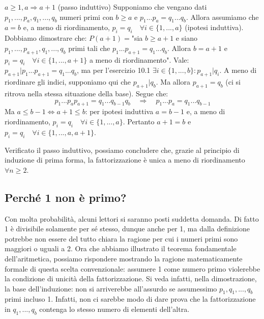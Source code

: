 \begin{tcolorbox}[enhanced, breakable, title={Teorema Fondamentale dell'Aritmetica}]
$a \geq 1, a \Rightarrow a+1$ (passo induttivo) Supponiamo che vengano dati $p_1,...,p_a,
q_1,...,q_b$ numeri primi con $b \geq a$ e $p_1...p_a = q_1...q_b$. Allora
assumiamo che $a=b$ e, a meno di riordinamento, $p_i = q_i \quad \forall i \in \{1,...,a\}$
(ipotesi induttiva). Dobbiamo dimostrare che: $P(a+1)= $"sia $b \geq a+1$ e siano
$p_1,...,p_{a+1},q_1,...,q_b$ primi tali che $p_1...p_{a+1} = q_1...q_b$.
Allora $b = a+1$ e $p_i = q_i \quad \forall i \in \{1,...,a+1\}$
a meno di riordinamento". Vale: $p_{a+1}|p_1...p_{a+1} = q_1...q_b$, ma per
l'esercizio 10.1 $\exists i \in \{1,...,b\}: p_{a+1}|q_i$. A meno di riordinare
gli indici, supponiamo qui che $p_{a+1}|q_b$. Ma allora $p_{a+1} = q_b$ (ci si
ritrova nella stessa situazione della base). Segue che:
\[ p_1...p_ap_{a+1} = q_1...q_{b-1}q_b \quad \Rightarrow \quad  p_1...p_a = q_1...q_{b-1} \]
Ma $a \leq b-1 \Leftrightarrow a+1 \leq b$: per ipotesi induttiva $a = b-1$ e,
a meno di riordinamento, $p_i = q_i \quad \forall i \in \{1,...,a\}$. Pertanto
$a+1 = b$ e $p_i = q_i \quad \forall i \in \{1,...,a,a+1\}$.

Verificato il passo induttivo, possiamo concludere che, grazie al principio di
induzione di prima forma, la fattorizzazione è unica a meno di riordinamento
$\forall n \geq 2$.
\cvd
\end{tcolorbox}

\subsection*{Perché 1 non è primo?}
Con molta probabilità, alcuni lettori si saranno posti suddetta domanda. Di fatto
1 è divisibile solamente per sé stesso, dunque anche per 1, ma dalla definizione
potrebbe non essere del tutto chiara la ragione per cui i numeri primi
sono maggiori o uguali a 2. Ora che abbiamo illustrato il teorema fondamentale
dell'aritmetica, possiamo rispondere mostrando la ragione matematicamente
formale di questa scelta convenzionale: assumere 1 come numero primo violerebbe
la condizione di unicità della fattorizzazione. Si veda infatti, nella dimostrazione,
la base dell'induzione: non si arriverebbe
all'assurdo se assumessimo $p_1,q_1,...,q_b$ primi incluso 1. Infatti, non ci
sarebbe modo di dare prova che la fattorizzazione in $q_1,...,q_b$ contenga lo
stesso numero di elementi dell'altra.